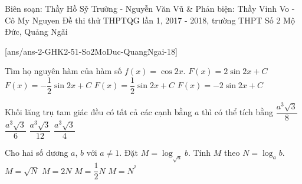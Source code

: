 
\begin{name}
    {Biên soạn: Thầy Hồ Sỹ Trường - Nguyễn Văn Vũ \& Phản biện: Thầy Vinh Vo - Cô My Nguyen}
    {Đề thi thử THPTQG lần 1, 2017 - 2018, trường THPT Số 2 Mộ Đức, Quảng Ngãi}
\end{name}
\setcounter{ex}{0}
[ans/ans-2-GHK2-51-So2MoDuc-QuangNgai-18]
\begin{ex}%
	Tìm họ nguyên hàm của hàm số $f(x)=\cos 2x$.
	\choice
	{$F(x)=2\sin 2x+C$}
	{$F(x)=-\dfrac{1}{2}\sin 2x+C$}
	{\True $F(x)=\dfrac{1}{2}\sin 2x+C$}
	{$F(x)=-2\sin 2x+C$}
\end{ex}
\begin{ex}%
	Khối lăng trụ tam giác đều có tất cả các cạnh bằng $a$ thì có thể tích bằng
	\choice
	{$\dfrac{a^3\sqrt{3}}{8}$}
	{$\dfrac{a^3\sqrt{3}}{6}$}
	{$\dfrac{a^3\sqrt{3}}{12}$}
	{\True $\dfrac{a^3\sqrt{3}}{4}$}
\end{ex}
\begin{ex}%
	Cho hai số dương $a$, $b$ với $a\ne 1$. Đặt $M=\log _{\sqrt{a}}b$. Tính $M$ theo $N=\log _ab$.
	\choice
	{$M=\sqrt{N}$}
	{\True $M=2N$}
	{$M=\dfrac{1}{2}N$}
	{$M=N^{^2}$}
\end{ex}
